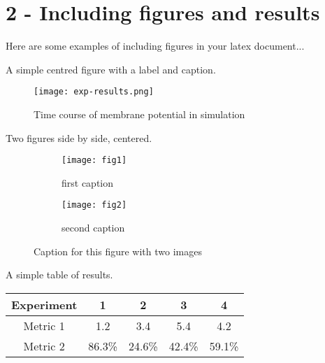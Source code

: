\section*{2 - Including figures and results}
Here are some examples of including figures in your latex document...

A simple centred figure with a label and caption.
\begin{figure}[H]
\centering
\caption{Time course of membrane potential in simulation}
\label{fig:q1a}
\texttt{[image: exp-results.png]}    
\end{figure}

Two figures side by side, centered.
\begin{figure}[H]
\centering
\begin{subfigure}[c]{0.4\textwidth}
\texttt{[image: fig1]}
\caption{first caption}
\label{fig:subim1}
\end{subfigure}
\begin{subfigure}[c]{0.4\textwidth}
\texttt{[image: fig2]}
\caption{second caption}
\label{fig:subim2}
\end{subfigure}
 
\caption{Caption for this figure with two images}
\label{fig:image2}
\end{figure}

A simple table of results.
\begin{center}
\begin{tabular}{ |c|c|c|c|c| } 
 \hline
 Experiment & 1 & 2 &
3 & 4 \\ 
 \hline
 Metric 1 &
 1.2 & 3.4 & 5.4 & 4.2 \\
 Metric 2 &
 86.3\% & 24.6\% & 42.4\% & 59.1\% \\ 
 \hline
\end{tabular}
\end{center}
